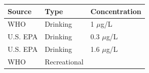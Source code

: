 \documentclass[11pt,]{article}
\begin{document}
\begin{longtable}[c]{@{}lll@{}}
\toprule
\begin{minipage}[b]{0.11\columnwidth}\raggedright\strut
Source
\strut\end{minipage} &
\begin{minipage}[b]{0.16\columnwidth}\raggedright\strut
Type
\strut\end{minipage} &
\begin{minipage}[b]{0.20\columnwidth}\raggedright\strut
Concentration
\strut\end{minipage}\tabularnewline
\midrule
\endhead
\begin{minipage}[t]{0.11\columnwidth}\raggedright\strut
WHO
\strut\end{minipage} &
\begin{minipage}[t]{0.16\columnwidth}\raggedright\strut
Drinking
\strut\end{minipage} &
\begin{minipage}[t]{0.20\columnwidth}\raggedright\strut
1 \(\mu\)g/L
\strut\end{minipage}\tabularnewline
\begin{minipage}[t]{0.11\columnwidth}\raggedright\strut
U.S. EPA
\strut\end{minipage} &
\begin{minipage}[t]{0.16\columnwidth}\raggedright\strut
Drinking
\strut\end{minipage} &
\begin{minipage}[t]{0.20\columnwidth}\raggedright\strut
0.3 \(\mu\)g/L
\strut\end{minipage}\tabularnewline
\begin{minipage}[t]{0.11\columnwidth}\raggedright\strut
U.S. EPA
\strut\end{minipage} &
\begin{minipage}[t]{0.16\columnwidth}\raggedright\strut
Drinking
\strut\end{minipage} &
\begin{minipage}[t]{0.20\columnwidth}\raggedright\strut
1.6 \(\mu\)g/L
\strut\end{minipage}\tabularnewline
\begin{minipage}[t]{0.11\columnwidth}\raggedright\strut
WHO
\strut\end{minipage} &
\begin{minipage}[t]{0.16\columnwidth}\raggedright\strut
Recreational
\strut\end{minipage} &
\begin{minipage}[t]{0.20\columnwidth}\raggedright\strut

\end{minipage}
\end{longtable}
\end{document}

